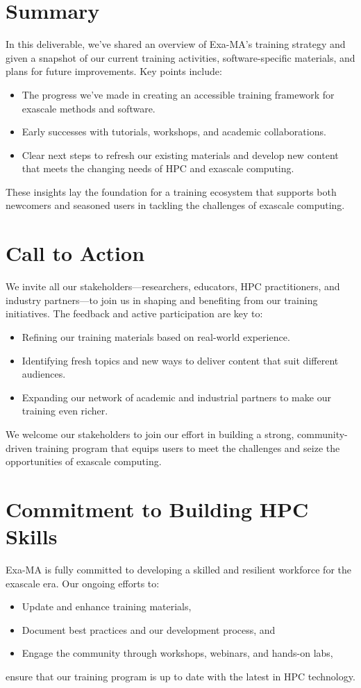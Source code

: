 \section*{Summary}
In this deliverable, we've shared an overview of Exa-MA's training strategy and given a snapshot of our current training activities, software-specific materials, and plans for future improvements. 
Key points include:
\begin{itemize}
    \item The progress we've made in creating an accessible training framework for exascale methods and software.
    \item Early successes with tutorials, workshops, and academic collaborations.
    \item Clear next steps to refresh our existing materials and develop new content that meets the changing needs of HPC and exascale computing.
\end{itemize}
These insights lay the foundation for a training ecosystem that supports both newcomers and seasoned users in tackling the challenges of exascale computing.

\section*{Call to Action}
We invite all our stakeholders—researchers, educators, HPC practitioners, and industry partners—to join us in shaping and benefiting from our training initiatives. 
The feedback and active participation are key to:
\begin{itemize}
    \item Refining our training materials based on real-world experience.
    \item Identifying fresh topics and new ways to deliver content that suit different audiences.
    \item Expanding our network of academic and industrial partners to make our training even richer.
\end{itemize}
We welcome our stakeholders to join our effort in building a strong, community-driven training program that equips users to meet the challenges and seize the opportunities of exascale computing.

\section*{Commitment to Building HPC Skills}
Exa-MA is fully committed to developing a skilled and resilient workforce for the exascale era. 
Our ongoing efforts to:
\begin{itemize}
    \item Update and enhance training materials,
    \item Document best practices and our development process, and
    \item Engage the community through workshops, webinars, and hands-on labs,
\end{itemize}
ensure that our training program is up to date with the latest in HPC technology.
